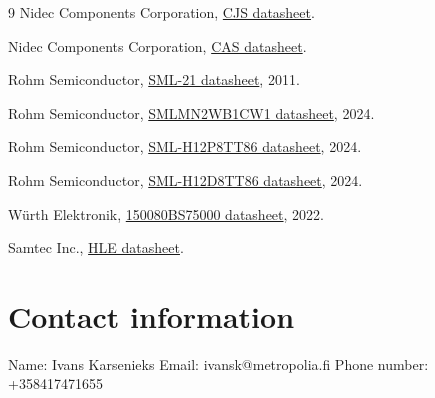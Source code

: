 \documentclass[10pt]{datasheet}
\begin{document}
\begin{thebibliography}{9}
Nidec Components Corporation, \href{https://www.nidec-components.com/e/catalog/switch/cjs.pdf}{CJS datasheet}.

Nidec Components Corporation, \href{https://www.nidec-components.com/e/catalog/switch/cas.pdf}{CAS datasheet}.

Rohm Semiconductor, \href{https://www.mouser.com/catalog/specsheets/rohm%20semiconductor_rohms26007-1.pdf}{SML-21 datasheet}, 2011.

Rohm Semiconductor, \href{https://fscdn.rohm.com/en/products/databook/datasheet/opto/led/chip_mono/smlmn2wb1cw1(c)-e.pdf}{SMLMN2WB1CW1 datasheet}, 2024.

Rohm Semiconductor, \href{https://fscdn.rohm.com/en/products/databook/datasheet/opto/led/chip_mono/sml-h12p8tt86-e.pdf}{SML-H12P8TT86 datasheet}, 2024.

Rohm Semiconductor, \href{https://fscdn.rohm.com/en/products/databook/datasheet/opto/led/chip_mono/sml-h12d8tt86-e.pdf}{SML-H12D8TT86 datasheet}, 2024.

Würth Elektronik, \href{https://www.we-online.com/components/products/datasheet/150080BS75000.pdf}{150080BS75000 datasheet}, 2022.

Samtec Inc., \href{https://eu.mouser.com/datasheet/2/527/hle-2854334.pdf}{HLE datasheet}.

\end{thebibliography}
\section{Contact information}
Name: Ivans Karsenieks\newline
Email: ivansk@metropolia.fi\newline
Phone number: +358417471655
\end{document}
